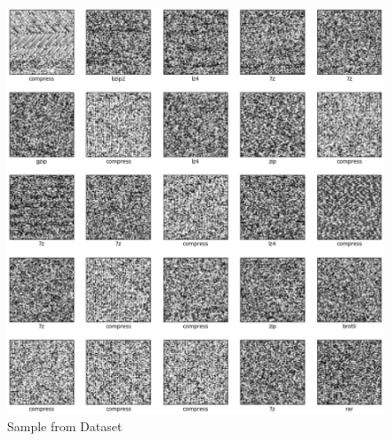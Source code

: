 \documentclass[conference]{IEEEtran}
\begin{document}
\subsection{}
\begin{figure}[H]
    \centering
    \includegraphics[scale=0.2]{./samples.png}
    \caption{Sample from Dataset}
    \label{fig:samples}
\end{figure}
\end{document}
